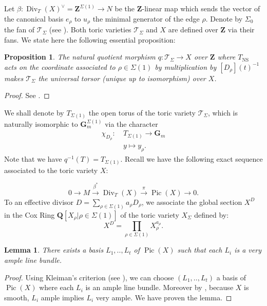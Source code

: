 \documentclass{proc-l}
\newcommand{\Z}{\mathbf{Z}}
\newcommand{\Q}{\mathbf{Q}}
\newcommand{\G}{\mathbf{G}}
\DeclareMathOperator{\Pic}{Pic}
\DeclareMathOperator{\Div}{Div}
\DeclareMathOperator{\NS}{NS}
\newcommand{\stackT}{\mathcal{T}}
\newtheorem{lemma}[theorem]{Lemma}
\newtheorem{prop}[theorem]{Proposition}
\theoremstyle{definition}
\theoremstyle{remark}
\numberwithin{equation}{section}
\begin{document}
Let $\beta : \Div_T(X)^{\vee} = \Z^{\Sigma(1)} \rightarrow N$ be the $\Z$-linear map which sends the vector of the canonical basis $e_{\rho}$ to $u_{\rho}$ the minimal generator of the edge $\rho$. Denote by $\Sigma_0$ the fan of $\stackT_{\Sigma}$ (see \cite[proposition 5.19]{CoxLittleSchenck2011}). Both toric varieties $\stackT_{\Sigma}$ and $X$ are defined over $\Z$ via their fans. We state here the following essential proposition:

\begin{prop}\label{universal_torsor_over_toric_variety}
    The natural quotient morphism $q : \stackT_{\Sigma} \rightarrow X$ over $\Z$ where $T_{\NS}$ acts on the coordinate associated to $\rho \in \Sigma(1)$ by multiplication by $[D_{\rho}](t)^ {-1}$ makes $\stackT_{\Sigma}$ the universal torsor (unique up to isomorphism) over $X$.
\end{prop}

\begin{proof}
    See \cite[Theorem 5.9]{bongiorno_toric_stacks}.
\end{proof}

We shall denote by $T_{\Sigma(1)}$ the open torus of the toric variety $\stackT_{\Sigma}$, which is naturally isomorphic to $\G_m^{\Sigma(1)}$ via the character 
    \begin{align*}
        \chi_{D_{\rho}} : \ &T_{\Sigma(1)} \rightarrow \G_m \\
        &y \longmapsto y_{\rho} .
    \end{align*}Note that we have $q^{-1}(T) = T_{\Sigma(1)}$.
Recall we have the following exact sequence associated to the toric variety $X$:

$$ 0 \rightarrow M \xrightarrow{\beta^*} \Div_T(X) \xrightarrow{\pi} \Pic(X) \rightarrow 0 .$$To an effective divisor $D = \sum\limits_{\rho \in \Sigma(1)} a_{\rho} D_{\rho}$, we associate the global section $X^D$ in the Cox Ring $\Q[X_{\rho} | \rho \in \Sigma(1) ]$ of the toric variety $X_{\Sigma}$ defined by: $$X^D = \prod\limits_{\rho \in \Sigma(1)} X_ {\rho}^{a_{\rho}} .$$



\begin{lemma}\label{application_of_demazure_kleiman_criterion}
    There exists a basis $L_1,..,L_t$ of $\Pic(X)$ such that each $L_i$ is a very ample line bundle.
\end{lemma}

\begin{proof}
    Using Kleiman's criterion (see \cite[theorem 1.27]{debarre2001higher}), we can choose $(L_1,..,L_t)$ a basis of $\Pic(X)$ where each $L_i$ is an ample line bundle. Moreover by \cite[theorem 6.1.16]{CoxLittleSchenck2011}, because $X$ is smooth, $L_i$ ample implies $L_i$ very ample. We have proven the lemma.
\end{proof}
\end{document}

